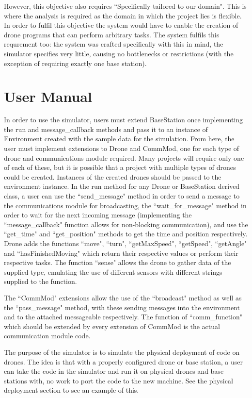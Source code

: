 	However, this objective also requires ``Specifically tailored to our domain". This is where the analysis is required as
	the domain in which the project lies is flexible. In order to fulfil this objective the system would have to enable the
	creation of drone programs that can perform arbitrary tasks. The system fulfils this requrement too: the system was crafted
	specifically with this in mind, the simulator specifies very little, causing no bottlenecks or restrictions (with the exception
	of requiring exactly one base station).

\section{User Manual}
	In order to use the simulator, users must extend BaseStation once implementing the run and message\_callback methods and pass it to an
	instance of Environment created with the sample data for the simulation. From here, the user must implement extensions to Drone and CommMod,
	one for each type of drone and communications module required. Many projects will require only one of each of these, but it is
	possible that a project with multiple types of drones could be created. Instances of the created drones should be passed to
	the environment instance. In the run method for any Drone or BaseStation derived class, a user can use the ``send\_message" method
	in order to send a message to the communications module for broadcasting, the ``wait\_for\_message" method in order to wait for
	the next incoming message (implementing the ``message\_callback" function allows for non-blocking communication), and use the
	``get\_time" and ``get\_position" methods to get the time and position respectively. Drone adds the functions ``move", ``turn",
	``getMaxSpeed", ``getSpeed", ``getAngle" and ``hasFinishedMoving" which return their respective values or perform their respective tasks. The
	function ``sense" allows the drone to gather data of the supplied type, emulating the use of different sensors with different strings supplied to the
	function.

	The ``CommMod" extensions allow the use of the ``broadcast" method as well as the ``pass\_message" method, with these sending
	messages into the environment and to the attached messageable respectively. The function of ``comm\_function" which should be
	extended by every extension of CommMod is the actual communication module code.

	The purpose of the simulator is to simulate the physical deployment of code on drones. The idea is that with a properly
	configured drone or base station, a user can take the code in the simulator and run it on physical drones and base stations
	with, no work to port the code to the new machine. See the physical deployment section to see an example of this.
